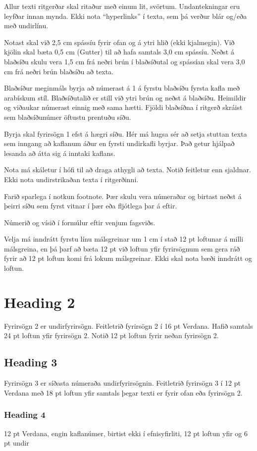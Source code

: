 \documentclass[a4paper,12pt,twoside,BCOR=10mm]{scrbook}
\begin{document}
Allur texti ritgerðar skal ritaður með einum lit, svörtum. Undantekningar eru leyfðar innan mynda. Ekki nota “hyperlinks” í texta, sem þá verður blár og/eða með undirlínu.

Notast skal við 2,5 cm spássíu fyrir ofan og á ytri hlið (ekki kjalmegin). Við kjölin skal bæta 0,5 cm (Gutter) til að hafa samtals 3,0 cm spássíu. Neðst á blaðsíðu skulu vera 1,5 cm frá neðri brún í blaðsíðutal og spássían skal vera 3,0 cm frá neðri brún blaðsíðu að texta.

Blaðsíður meginmáls byrja að númerast á 1 á fyrstu blaðsíðu fyrsta kafla með arabískum stíl. Blaðsíðutalið er still við ytri brún og neðst á blaðsíðu. Heimildir og viðaukar númerast einnig með sama hætti. Fjöldi blaðsíðna í ritgerð skráist sem blaðsíðunúmer öftustu prentuðu síðu.

Byrja skal fyrirsögn 1 efst á hægri síðu. Hér má hugsa sér að setja stuttan texta sem inngang að kaflanum áður en fyrsti undirkafli byrjar. Það getur hjálpað lesanda að átta sig á inntaki kaflans.

Nota má skáletur í hófi til að draga athygli að texta. Notið feitletur enn sjaldnar. Ekki nota undirstrikaðan texta í ritgerðinni.

Farið sparlega í notkun footnote. Þær skulu vera númeraðar og birtast neðst á þeirri síðu sem fyrst vitnar í þær eða fljótlega þar á eftir.

Númerið og vísið í formúlur eftir venjum fagsviðs.

Velja má inndrátt fyrstu línu málsgreinar um 1 cm í stað 12 pt loftunar á milli málsgreina, en þá þarf að bæta 12 pt við loftun yfir fyrirsögnum sem gera ráð fyrir að 12 pt loftun komi frá lokum málsgreinar. Ekki skal nota bæði inndrátt og loftun.

\section{Heading 2}
Fyrirsögn 2 er undirfyrirsögn. Feitletrið fyrirsögn 2 í 16 pt Verdana. Hafið samtals 24 pt loftun yfir fyrirsögn 2. Notið 12 pt loftun fyrir neðan fyrirsögn 2.

\subsection{Heading 3}
Fyrirsögn 3 er síðasta númeraða undirfyrirsögnin. Feitletrið fyrirsögn 3 í 12 pt Verdana með 18 pt loftun yfir samtals þegar texti er fyrir ofan eða fyrirsögn 2. 
\subsubsection{Heading 4}
12 pt Verdana, engin kaflanúmer, birtist ekki í efnisyfirliti, 12 pt loftun yfir og 6 pt undir
\end{document}
